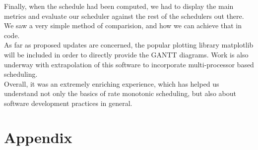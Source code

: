 Finally, when the schedule had been computed, we had to display the main metrics and evaluate our scheduler against the rest of the schedulers out there. We saw a very simple method of comparision, and how we can achieve that in code.\\

As far as proposed updates are concerned, the popular plotting library matplotlib will be included in order to directly provide the GANTT diagrams. Work is also underway with extrapolation of this software to incorporate multi-processor based scheduling.\\

Overall, it was an extremely enriching experience, which has helped us understand not only the basics of rate monotonic scheduling, but also about software development practices in general.




\pagebreak
\section*{Appendix}


